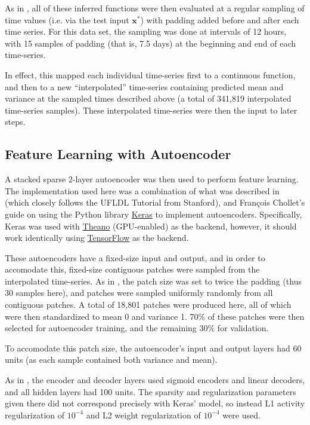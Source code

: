\documentclass[journal]{IEEEtran}
\begin{document}
As in \cite{Lasko2013}, all of these inferred functions were then
evaluated at a regular sampling of time values (i.e. via the test
input $\mathbf{x^*}$) with padding added before and after each time
series.  For this data set, the sampling was done at intervals of 12
hours, with 15 samples of padding (that is, 7.5 days) at the beginning
and end of each time-series.

In effect, this mapped each individual time-series first to a
continuous function, and then to a new ``interpolated'' time-series
containing predicted mean and variance at the sampled times described
above (a total of 341,819 interpolated time-series samples).  These
interpolated time-series were then the input to later steps.

\subsection{Feature Learning with Autoencoder}

A stacked sparse 2-layer autoencoder was then used to perform feature
learning.  The implementation used here was a combination of what was
described in \cite{Lasko2013} (which closely follows the UFLDL
Tutorial from Stanford\cite{Ng}), and Fran\c cois Chollet's
guide\cite{Chollet} on using the Python library
\href{https://keras.io/}{Keras} to implement autoencoders.
Specifically, Keras was used with
\href{http://deeplearning.net/software/theano/}{Theano} (GPU-enabled)
as the backend, however, it should work identically using
\href{https://www.tensorflow.org/}{TensorFlow} as the backend.

These autoencoders have a fixed-size input and output, and in order to
accomodate this, fixed-size contiguous patches were sampled from the
interpolated time-series.  As in \cite{Lasko2013}, the patch size was
set to twice the padding (thus 30 samples here), and patches were
sampled uniformly randomly from all contiguous patches.  A total of
18,801 patches were produced here, all of which were then standardized
to mean 0 and variance 1.  70\% of these patches were then selected
for autoencoder training, and the remaining 30\% for validation.

To accomodate this patch size, the autoencoder's input and output
layers had 60 units (as each sample contained both variance and mean).

As in \cite{Lasko2013}, the encoder and decoder layers used sigmoid
encoders and linear decoders, and all hidden layers had 100 units.
The sparsity and regularization parameters given there did not
correspond precisely with Keras' model, so instead L1 activity
regularization of $10^{-4}$ and L2 weight regularization of $10^{-4}$
were used.
\end{document}
